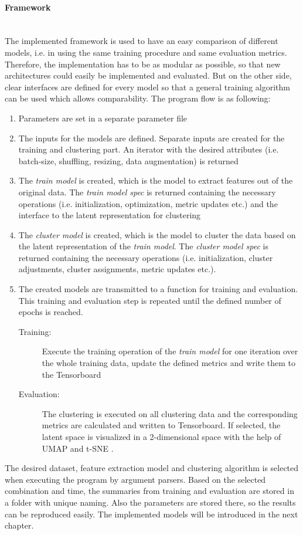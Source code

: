 \documentclass[12pt,DIV14,BCOR12mm,a4paper,footexclude,headinclude,halfparskip-,twoside,openright,cleardoubleempty,idxtotoc,bibtotoc,listtotoc]{scrreprt} %
\numberwithin{equation}{chapter}
\begin{document}
\paragraph{Framework}\mbox{}\\
The implemented framework is used to have an easy comparison of different models, i.e. in using the same training procedure and same evaluation metrics. Therefore, the implementation has to be as modular as possible, so that new architectures could easily be implemented and evaluated. But on the other side, clear interfaces are defined for every model so that a general training algorithm can be used which allows comparability. The program flow is as following:
\begin{enumerate}
	\item Parameters are set in a separate parameter file
	\item The inputs for the models are defined. Separate inputs are created for the training and clustering part. An iterator with the desired attributes (i.e. batch-size, shuffling, resizing, data augmentation) is returned 
	\item The \textit{train model} is created, which is the model to extract features out of the original data. The \textit{train model spec} is returned containing the necessary operations (i.e. initialization, optimization, metric updates etc.) and the interface to the latent representation for clustering
	\item The \textit{cluster model} is created, which is the model to cluster the data based on the latent representation of the \textit{train model}. The \textit{cluster model spec} is returned containing the necessary operations (i.e. initialization, cluster adjustments, cluster assignments, metric updates etc.).
	\item The created models are transmitted to a function for training and evaluation. This training and evaluation step is repeated until the defined number of epochs is reached.
		\begin{description}
			\item[Training:] Execute the training operation of the \textit{train model} for one iteration over the whole training data, update the defined metrics and write them to the Tensorboard
			\item[Evaluation:] The clustering is executed on all clustering data and the corresponding metrics are calculated and written to Tensorboard. If selected, the latent space is visualized in a 2-dimensional space with the help of UMAP \cite{mcinnes2018umap-software} and t-SNE \cite{t-SNE}.			
		\end{description}
\end{enumerate}
The desired dataset, feature extraction model and clustering algorithm is selected when executing the program by argument parsers. Based on the selected combination and time, the summaries from training and evaluation are stored in a folder with unique naming. Also the parameters are stored there, so the results can be reproduced easily. The implemented models will be introduced in the next chapter.
\end{document}
